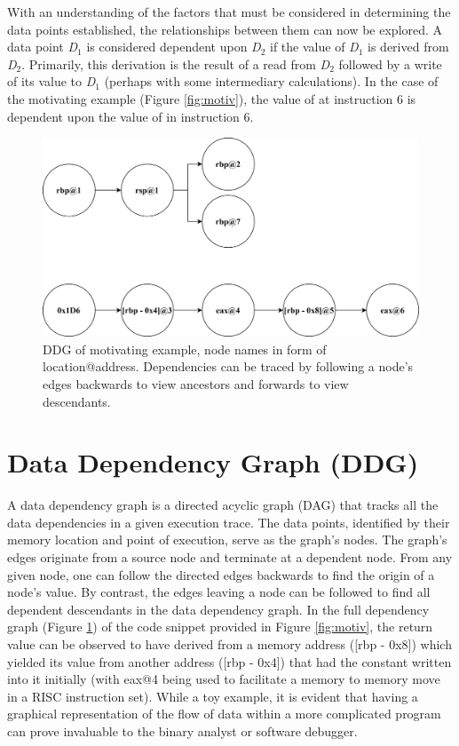 With an understanding of the factors that must be considered in determining the data points established, the relationships between them can now be explored. A data point \emph{D$_1$} is considered dependent upon \emph{D$_2$} if the value of \emph{D$_1$} is derived from \emph{D$_2$}. Primarily, this derivation is the result of a read from  \emph{D$_2$} followed by a write of its value to \emph{D$_1$} (perhaps with some intermediary calculations). In the case of the motivating example (Figure \ref{fig:motiv}), the value of \code{[rbp - 0x8]} at instruction 6 is dependent upon the value of  in instruction 6.

\begin{figure}
    \centering
    \includegraphics[width=0.8\linewidth]{images/ddg.png}
    \caption[DDG of Motivating Example]{DDG of motivating example, node names in form of location@address. Dependencies can be traced by following a node's edges backwards to view ancestors and forwards to view descendants.}
    \label{fig:motivddg}
\end{figure}

\section{Data Dependency Graph (DDG)}
A data dependency graph is a directed acyclic graph (DAG) that tracks all the data dependencies in a given execution trace. The data points, identified by their memory location and point of execution, serve as the graph’s nodes. The graph's edges originate from a source node and terminate at a dependent node. From any given node, one can follow the directed edges backwards to find the origin of a node’s value. By contrast, the edges leaving a node can be followed to find all dependent descendants in the data dependency graph. In the full dependency graph (Figure \ref{fig:motivddg}) of the code snippet provided in Figure \ref{fig:motiv}, the return value can be observed to have derived from a memory address ([rbp - 0x8]) which yielded its value from another address ([rbp - 0x4]) that had the constant written into it initially (with eax@4 being used to facilitate a memory to memory move in a RISC instruction set). While a toy example, it is evident that having a graphical representation of the flow of data within a more complicated program can prove invaluable to the binary analyst or software debugger.
